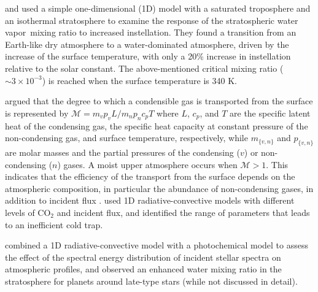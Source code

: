 \documentclass[11pt,numberedappendix,twocolappendix,]{emulateapj}
\newcommand{\wv}{{\color{orange}water vapor\ }}
\begin{document}
\citet{Kasting1993} and \citet{Kopparapu2013} used a simple one-dimensional (1D) model with a saturated troposphere and an isothermal stratosphere to examine the response of the stratospheric \wv mixing ratio to increased instellation. 
They found a transition from an Earth-like dry atmosphere to a water-dominated atmosphere, driven by the increase of the surface temperature, with only a 20\% increase in instellation relative to the solar constant. 
The above-mentioned critical mixing ratio ($\sim 3 \times 10^{-3}$) is reached when the surface temperature is 340 K. 


\citet{Wordsworth2013,Wordsworth2014} argued that the degree to which a condensible gas is transported from the surface is represented by $\mathcal{M} = m_v p_v L / m_n p_n c_p T $ where $L$, $c_p$, and $T$ are the specific latent heat of the condensing gas, the specific heat capacity at constant pressure of the non-condensing gas, and surface  temperature, respectively, while $m_{\{v,n\}}$ and $p_{\{v,n\}}$ are molar masses and the partial pressures of the  condensing ($v$) or non-condensing ($n$) gases. 
A moist upper atmosphere occurs when $\mathcal{M} > 1$. 
This indicates that the efficiency of the transport from the surface depends on the atmospheric composition, in particular the abundance of non-condensing gases, in addition to incident flux \citep{Wordsworth2014}. 
\citet{Wordsworth2013} used 1D radiative-convective models with different levels of CO$_2$ and incident flux, and identified the range of parameters that leads to an inefficient cold trap. 

\citet{Rugheimer2013,Rugheimer2015} combined a 1D radiative-convective model with a photochemical model to assess the effect of the spectral energy distribution of incident stellar spectra on atmospheric profiles, and observed an enhanced water mixing ratio in the stratosphere for planets around late-type stars (while not discussed in detail). 
\end{document}
